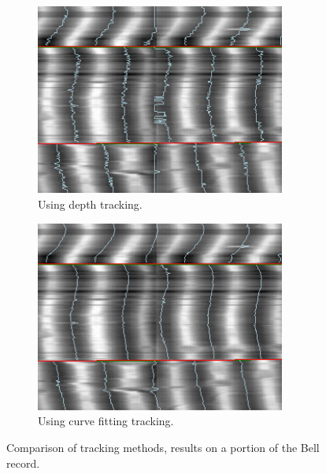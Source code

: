 \begin{figure}[!ht]
\centering
    \begin{subfigure}[t]{0.45\textwidth}
    \centering
    \includegraphics[width=0.9\textwidth]{images/tracking-comp-depth}
    \caption{Using depth tracking.}
    \label{fig:trackcompdepth}
    \end{subfigure}
    \begin{subfigure}[t]{0.45\textwidth}
    \centering
    \includegraphics[width=0.9\textwidth]{images/tracking-comp-fit}
    \caption{Using curve fitting tracking.}
    \label{fig:trackcompfit}
    \end{subfigure}
    \caption[Comparison of tracking methods.]
    {Comparison of tracking methods, results on a portion of the Bell record.}
    \label{fig:trackcomp}
\end{figure}

